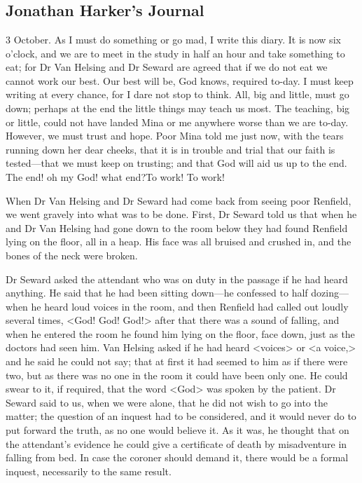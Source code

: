 \chapter[Chapter \thechapter]{}

\section{Jonathan Harker's Journal}

\begin{diary}{3 October.}
As I must do something or go mad, I write this diary. It is now six o'clock, and we are to meet in the study in half an hour and take something to eat; for Dr Van Helsing and Dr Seward are agreed that if we do not eat we cannot work our best. Our best will be, God knows, required to-day. I must keep writing at every chance, for I dare not stop to think. All, big and little, must go down; perhaps at the end the little things may teach us most. The teaching, big or little, could not have landed Mina or me anywhere worse than we are to-day. However, we must trust and hope. Poor Mina told me just now, with the tears running down her dear cheeks, that it is in trouble and trial that our faith is tested—that we must keep on trusting; and that God will aid us up to the end. The end! oh my God! what end?\textellipsis To work! To work!

When Dr Van Helsing and Dr Seward had come back from seeing poor Renfield, we went gravely into what was to be done. First, Dr Seward told us that when he and Dr Van Helsing had gone down to the room below they had found Renfield lying on the floor, all in a heap. His face was all bruised and crushed in, and the bones of the neck were broken.

Dr Seward asked the attendant who was on duty in the passage if he had heard anything. He said that he had been sitting down—he confessed to half dozing—when he heard loud voices in the room, and then Renfield had called out loudly several times, <God! God! God!> after that there was a sound of falling, and when he entered the room he found him lying on the floor, face down, just as the doctors had seen him. Van Helsing asked if he had heard <voices> or <a voice,> and he said he could not say; that at first it had seemed to him as if there were two, but as there was no one in the room it could have been only one. He could swear to it, if required, that the word <God> was spoken by the patient. Dr Seward said to us, when we were alone, that he did not wish to go into the matter; the question of an inquest had to be considered, and it would never do to put forward the truth, as no one would believe it. As it was, he thought that on the attendant's evidence he could give a certificate of death by misadventure in falling from bed. In case the coroner should demand it, there would be a formal inquest, necessarily to the same result.


\end{diary}
